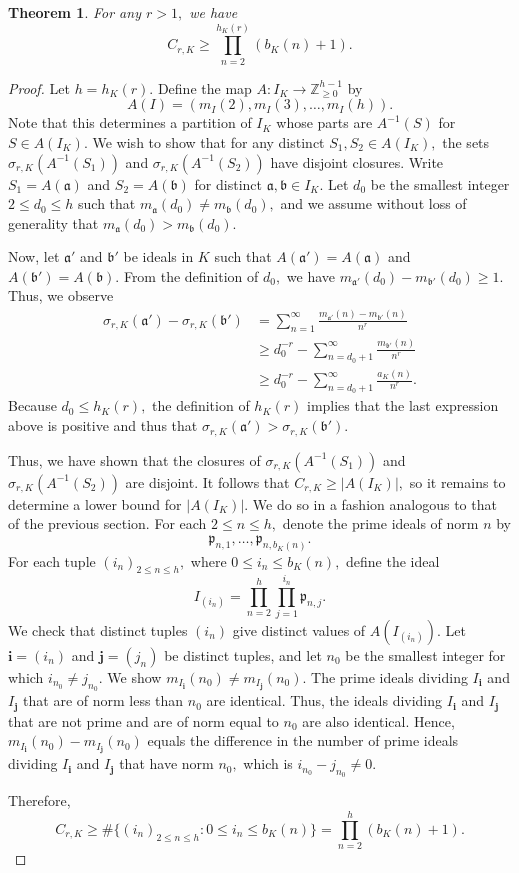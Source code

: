 \documentclass[12pt]{amsart}
\newtheorem{theorem}{Theorem}[section]
\theoremstyle{definition}
\numberwithin{equation}{section}
\newcommand{\fa}{\mathfrak{a}}
\newcommand{\bb}{\mathfrak{b}}
\newcommand{\ra}{\rightarrow}
\newcommand{\Z}{\mathbb{Z}}
\begin{document}
\begin{theorem} \label{partition}
    For any $r > 1,$ we have $$C_{r,K} \geq \prod_{n=2}^{h_K(r)} (b_K(n) + 1).$$
\end{theorem}

\begin{proof}
    Let $h = h_K(r).$ Define the map $A : I_K \ra \Z_{\geq 0}^{h-1}$ by $$A(I) = (m_I(2), m_I(3), \ldots, m_I(h)).$$ Note that this determines a partition of $I_K$ whose parts are $A^{-1}(S)$ for $S \in A(I_K).$ We wish to show that for any distinct $S_1, S_2 \in A(I_K),$ the sets $\sigma_{r,K}(A^{-1}(S_1))$ and $\sigma_{r,K}(A^{-1}(S_2))$ have disjoint closures. Write $S_1 = A(\mathfrak a)$ and $S_2 = A(\mathfrak b)$ for distinct $\mathfrak a, \mathfrak b \in I_K.$ Let $d_0$ be the smallest integer $2 \leq d_0 \leq h$ such that $m_\fa(d_0) \neq m_\bb(d_0),$ and we assume without loss of generality that $m_\fa(d_0) > m_\bb(d_0).$ 

    Now, let $\fa'$ and $\bb'$ be ideals in $K$ such that $A(\fa') = A(\fa)$ and $A(\bb') = A(\bb).$ From the definition of $d_0,$ we have $m_{\fa'}(d_0) - m_{\bb'}(d_0) \geq 1.$ Thus, we observe 
    \begin{align*}
        \sigma_{r,K}(\fa') - \sigma_{r,K}(\bb') &= \sum_{n=1}^\infty \frac{m_{\fa'}(n) - m_{\bb'}(n)}{n^r} \\
        &\geq d_0^{-r} - \sum_{n = d_0+1}^\infty \frac{m_{\bb'}(n)}{n^r} \\
        &\geq d_0^{-r} - \sum_{n = d_0+1}^\infty \frac{a_K(n)}{n^r}.
    \end{align*} Because $d_0 \leq h_K(r),$ the definition of $h_K(r)$ implies that the last expression above is positive and thus that $\sigma_{r,K}(\fa') > \sigma_{r,K}(\bb').$

    Thus, we have shown that the closures of $\sigma_{r,K}(A^{-1}(S_1))$ and $\sigma_{r,K}(A^{-1}(S_2))$ are disjoint. It follows that $C_{r,K} \geq |A(I_K)|,$ so it remains to determine a lower bound for $|A(I_K)|.$ We do so in a fashion analogous to that of the previous section. For each $2 \leq n \leq h,$ denote the prime ideals of norm $n$ by $$\mathfrak{p}_{n, 1}, \ldots, \mathfrak{p}_{n, b_K(n)}.$$ For each tuple $(i_n)_{2 \leq n \leq h},$ where $0 \leq i_n \leq b_K(n),$ define the ideal $$I_{(i_n)} = \prod_{n=2}^h \prod_{j=1}^{i_n} \mathfrak{p}_{n, j}.$$ We check that distinct tuples $(i_n)$ give distinct values of $A(I_{(i_n)}).$ Let $\textbf{i} =(i_n)$ and $\textbf{j} = (j_n)$ be distinct tuples, and let $n_0$ be the smallest integer for which $i_{n_0} \neq j_{n_0}.$ We show $m_{I_\textbf{i}}(n_0) \neq m_{I_\textbf{j}}(n_0).$ The prime ideals dividing $I_\textbf{i}$ and $I_\textbf{j}$ that are of norm less than $n_0$ are identical. Thus, the ideals dividing $I_\textbf{i}$ and $I_\textbf{j}$ that are not prime and are of norm equal to $n_0$ are also identical. Hence, $m_{I_\textbf{i}}(n_0) - m_{I_\textbf{j}}(n_0)$ equals the difference in the number of prime ideals dividing $I_\textbf{i}$ and $I_\textbf{j}$ that have norm $n_0,$ which is $i_{n_0} - j_{n_0} \neq 0.$

    
    Therefore, $$C_{r,K} \geq \#\{(i_n)_{2 \leq n \leq h} : 0 \leq i_n \leq b_K(n)\} = \prod_{n=2}^h (b_K(n) + 1).$$\end{proof}
\end{document}

